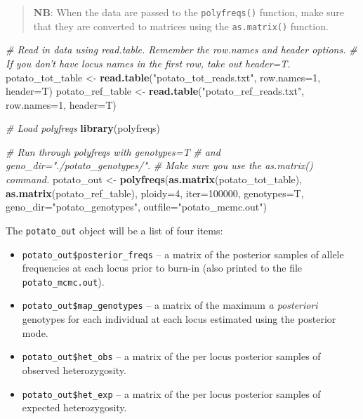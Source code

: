 \documentclass[]{article}
\newenvironment{Shaded}{\begin{snugshade}}{\end{snugshade}}
\newcommand{\KeywordTok}[1]{\textcolor[rgb]{0.13,0.29,0.53}{\textbf{{#1}}}}
\newcommand{\DataTypeTok}[1]{\textcolor[rgb]{0.13,0.29,0.53}{{#1}}}
\newcommand{\DecValTok}[1]{\textcolor[rgb]{0.00,0.00,0.81}{{#1}}}
\newcommand{\StringTok}[1]{\textcolor[rgb]{0.31,0.60,0.02}{{#1}}}
\newcommand{\CommentTok}[1]{\textcolor[rgb]{0.56,0.35,0.01}{\textit{{#1}}}}
\newcommand{\NormalTok}[1]{{#1}}
\begin{document}
\begin{quote}
\textbf{NB}: When the data are passed to the \texttt{polyfreqs()}
function, make sure that they are converted to matrices using the
\texttt{as.matrix()} function.
\end{quote}

\begin{Shaded}
\begin{Highlighting}[]
\CommentTok{# Read in data using read.table. Remember the row.names and header options.}
\CommentTok{# If you don't have locus names in the first row, take out header=T.}
\NormalTok{potato_tot_table <-}\StringTok{ }\KeywordTok{read.table}\NormalTok{(}\StringTok{"potato_tot_reads.txt"}\NormalTok{, }\DataTypeTok{row.names=}\DecValTok{1}\NormalTok{, }\DataTypeTok{header=}\NormalTok{T)}
\NormalTok{potato_ref_table <-}\StringTok{ }\KeywordTok{read.table}\NormalTok{(}\StringTok{"potato_ref_reads.txt"}\NormalTok{, }\DataTypeTok{row.names=}\DecValTok{1}\NormalTok{, }\DataTypeTok{header=}\NormalTok{T)}

\CommentTok{# Load polyfreqs}
\KeywordTok{library}\NormalTok{(polyfreqs)}

\CommentTok{# Run through polyfreqs with genotypes=T}
\CommentTok{# and geno_dir="./potato_genotypes/".}
\CommentTok{# Make sure you use the as.matrix() command.}
\NormalTok{potato_out <-}\StringTok{ }\KeywordTok{polyfreqs}\NormalTok{(}\KeywordTok{as.matrix}\NormalTok{(potato_tot_table), }
                        \KeywordTok{as.matrix}\NormalTok{(potato_ref_table), }\DataTypeTok{ploidy=}\DecValTok{4}\NormalTok{, }\DataTypeTok{iter=}\DecValTok{100000}\NormalTok{, }
                        \DataTypeTok{genotypes=}\NormalTok{T, }\DataTypeTok{geno_dir=}\StringTok{"potato_genotypes"}\NormalTok{, }
                        \DataTypeTok{outfile=}\StringTok{"potato_mcmc.out"}\NormalTok{)}
\end{Highlighting}
\end{Shaded}

The \texttt{potato\_out} object will be a list of four items:

\begin{itemize}
\item
  \texttt{potato\_out\$posterior\_freqs} -- a matrix of the posterior
  samples of allele frequencies at each locus prior to burn-in (also
  printed to the file \texttt{potato\_mcmc.out}).
\item
  \texttt{potato\_out\$map\_genotypes} -- a matrix of the maximum
  \emph{a posteriori} genotypes for each individual at each locus
  estimated using the posterior mode.
\item
  \texttt{potato\_out\$het\_obs} -- a matrix of the per locus posterior
  samples of observed heterozygosity.
\item
  \texttt{potato\_out\$het\_exp} -- a matrix of the per locus posterior
  samples of expected heterozygosity.
\end{itemize}
\end{document}
